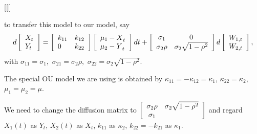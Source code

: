 \documentclass[11pt]{article}%
\theoremstyle{definition}
\begin{document}
[[[

to transfer this model to our model, say%
\[
d\left[
\begin{array}
[c]{l}%
{X}_{t}\\
{Y}_{t}%
\end{array}
\right]  =\left[
\begin{array}
[c]{ll}%
{k_{11}} & {k_{12}}\\
{0} & {k_{22}}%
\end{array}
\right]  \left[
\begin{array}
[c]{l}%
{\mu_{1}-X}_{t}\\
{\mu_{2}-Y}_{t}%
\end{array}
\right]  dt+\left[
\begin{array}
[c]{cc}%
{\sigma_{1}} & {0}\\
{\sigma_{2}}\rho & {\sigma_{2}\sqrt{1-\rho^{2}}}%
\end{array}
\right]  d\left[
\begin{array}
[c]{l}%
{W_{1,t}}\\
{W_{2,t}}%
\end{array}
\right]  ,
\]
with ${\sigma_{11}=\sigma_{1},}$ ${\sigma_{21}=\sigma_{2}}\rho,$ ${\sigma
_{22}=\sigma_{2}\sqrt{1-\rho^{2}}}$.

The special OU model we are using is obtained by $\kappa_{11}=-\kappa
_{12}=\kappa_{1}$, $\kappa_{22}=\kappa_{2}$, $\mu_{1}=\mu_{2}=\mu$.

\bigskip We need to change the diffusion matrix to $\left[
\begin{array}
[c]{cc}%
{\sigma_{2}\rho} & {\sigma_{2}\sqrt{1-\rho^{2}}}\\
\sigma_{1} &
\end{array}
\right]  $ and regard ${X_{1}(t)}$ as $Y_{t}$, ${X_{2}(t)}$ as $X_{t}$,
$k_{11}$ as $\kappa_{2}$, $k_{22}=-k_{21}$ as $\kappa_{1}$.
\end{document}
